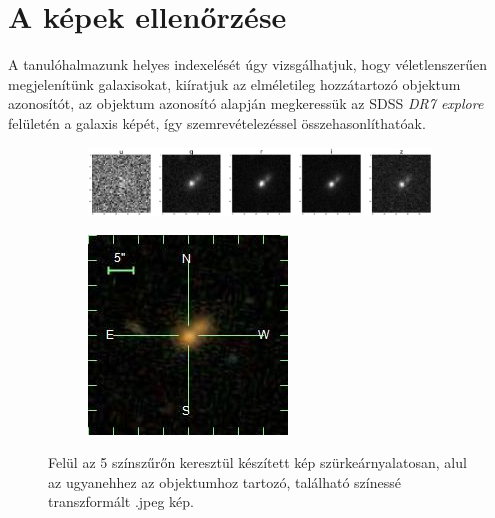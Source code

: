 \documentclass[12pt,letterpaper,oneside,openright]{book}
\begin{document}
\section{A képek ellenőrzése}
\label{ims}
A tanulóhalmazunk helyes indexelését úgy vizsgálhatjuk, hogy véletlenszerűen megjelenítünk galaxisokat, kiíratjuk az elméletileg hozzátartozó objektum azonosítót, az objektum azonosító alapján megkeressük az SDSS \textit{DR7 explore} felületén\cite{explore} a galaxis képét, így szemrevételezéssel összehasonlíthatóak. 
\begin{figure}[h!]
 \centering
  \begin{subfigure}[b]{\textwidth}
    \includegraphics[width=\textwidth]{Figures/FILTERS.png}
    \label{fig:1}
  \end{subfigure}
  \hspace{1.7cm}
  \begin{subfigure}[b]{0.2\textwidth}
    \includegraphics[width=\textwidth]{Figures/imgal.jpeg}
    \label{fig:2}
  \end{subfigure}
  \caption{Felül az 5 színszűrőn keresztül készített kép szürkeárnyalatosan, alul az ugyanehhez az objektumhoz tartozó, \cite{explore} található színessé transzformált .jpeg kép.}
\label{cnn1}
\end{figure}
\end{document}
